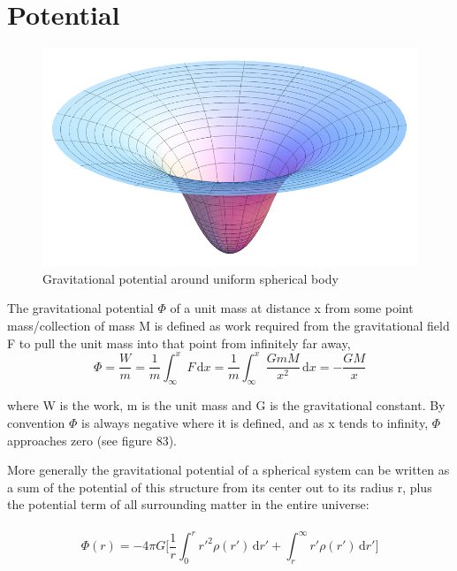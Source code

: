 \section{Potential}

\begin{figure}
\centering
\includegraphics[width=1.0\linewidth]{img/GravityPotential.jpg}
\caption{Gravitational potential around uniform spherical body}
\label{fig:test}
\end{figure}

The gravitational potential $\Phi$ of a unit mass at distance x from some point mass/collection of mass M is defined as work required from the gravitational field F to pull the unit mass into that point from infinitely far away, \\ 

\begin{equation}
\Phi = \frac{W}{m} = 
\frac{1}{m} \int_{\infty}^{x} \! F \, \mathrm{d}x =
\frac{1}{m} \int_{\infty}^{x} \! \frac{GmM}{x^2} \, \mathrm{d}x =
-\frac{GM}{x}
\end{equation}

where W is the work, m is the unit mass and G is the gravitational constant. By convention $\Phi$ is always negative where it is defined, and as x tends to infinity, $\Phi$ approaches zero (see figure 83). 

More generally the gravitational potential of a spherical system can be written as a sum of the potential of this structure from its center out to its radius r, plus the potential term of all surrounding matter in the entire universe: \\ \\

\begin{equation}
\Phi(r) = -4\pi G \Bigg[ \frac{1}{r} \int_0^r \! r'^2 \rho(r') \, \mathrm{d}r' + \int_r^{\infty} \! r' \rho(r') \, \mathrm{d}r' \Bigg]
\end{equation}

